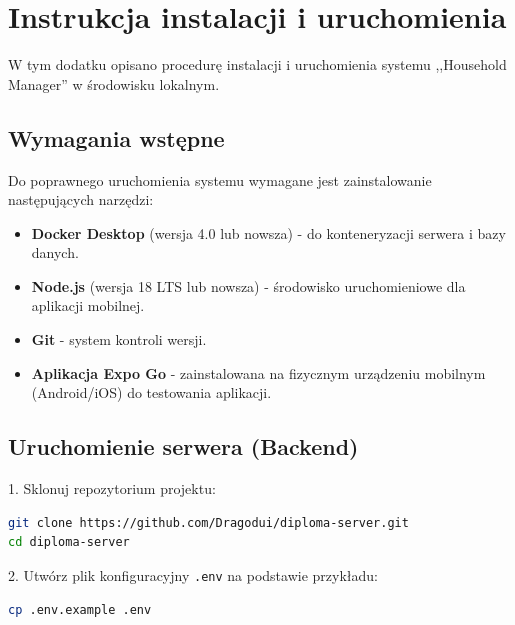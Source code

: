 %
\chapter{Instrukcja instalacji i uruchomienia}
\label{chapter:dodatek_A}

W tym dodatku opisano procedurę instalacji i uruchomienia systemu ,,Household Manager'' w środowisku lokalnym.

\section{Wymagania wstępne}

Do poprawnego uruchomienia systemu wymagane jest zainstalowanie następujących narzędzi:
\begin{itemize}
    \item \textbf{Docker Desktop} (wersja 4.0 lub nowsza) - do konteneryzacji serwera i bazy danych.
    \item \textbf{Node.js} (wersja 18 LTS lub nowsza) - środowisko uruchomieniowe dla aplikacji mobilnej.
    \item \textbf{Git} - system kontroli wersji.
    \item \textbf{Aplikacja Expo Go} - zainstalowana na fizycznym urządzeniu mobilnym (Android/iOS) do testowania aplikacji.
\end{itemize}

\section{Uruchomienie serwera (Backend)}

1. Sklonuj repozytorium projektu:
\begin{lstlisting}[language=bash]
git clone https://github.com/Dragodui/diploma-server.git
cd diploma-server
\end{lstlisting}

2. Utwórz plik konfiguracyjny \texttt{.env} na podstawie przykładu:
\begin{lstlisting}[language=bash]
cp .env.example .env
\end{lstlisting}


